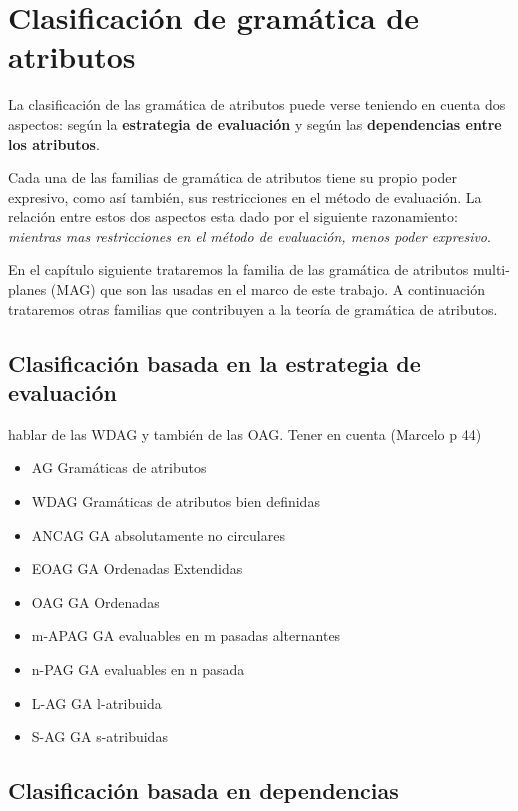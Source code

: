 \chapter{Clasificación de gramática de atributos}
\label{chap: clas_ag}
\minitoc

La clasificación de las gramática de atributos puede verse teniendo en cuenta dos aspectos: según la \textbf{estrategia de evaluación} y según las \textbf{dependencias entre los atributos}. 

Cada una de las familias de gramática de atributos tiene su propio poder expresivo, como así también, sus restricciones en el método de evaluación. La relación entre estos dos aspectos esta dado por el siguiente razonamiento: \textit{mientras mas restricciones en el método de evaluación, menos poder expresivo}.

En el capítulo siguiente trataremos la familia de las gramática de atributos multi-planes (MAG) que son las usadas en el marco de este trabajo. A continuación trataremos otras familias que contribuyen a la teoría de gramática de atributos.

\section{Clasificación basada en la estrategia de evaluación}

hablar de las WDAG y también de las OAG. Tener en cuenta (Marcelo p 44)

\begin{itemize}
\item AG      Gramáticas de atributos
\item WDAG    Gramáticas de atributos bien definidas   
\item ANCAG   GA absolutamente no circulares
\item EOAG    GA Ordenadas Extendidas
\item OAG     GA Ordenadas       
\item m-APAG  GA evaluables en m pasadas alternantes       
\item n-PAG   GA evaluables en n pasada       
\item L-AG    GA l-atribuida        
\item S-AG    GA s-atribuidas
\end{itemize}

\section{Clasificación basada en dependencias}

